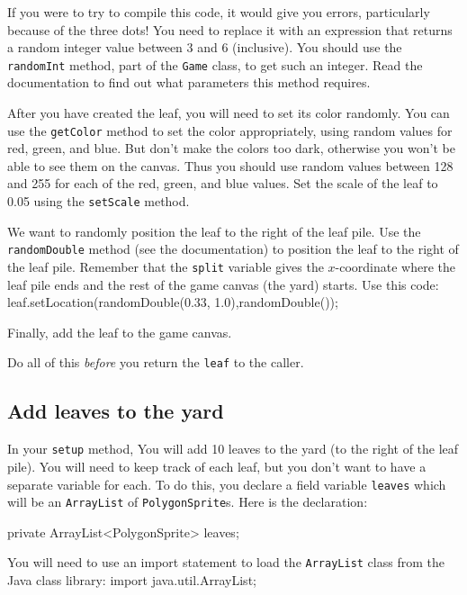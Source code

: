 \documentclass[12pt]{article}
\newenvironment{qv}%
  {\quote
   \verbatim}%
  {\endverbatim
   \endquote}
\newcommand{\code}{\texttt}
\begin{document}
If you were to try to compile this code, it would give you errors,
particularly because of the three dots! 
You need to replace it
with an expression that returns a random integer value between 3 and 6
(inclusive).
You should use the \code{randomInt} method, part of the \code{Game} class,
to get such an integer.  Read the documentation to find out
what parameters this method requires.

After you have created the leaf,
you will need to set its color randomly.
You can use the \code{getColor} method
to set the color appropriately, using random values for red, green, and blue.
But don't make the colors too dark,
otherwise you won't be able to see them on the canvas.
Thus you should use random values between 128 and 255
for each of the red, green, and blue values.
Set the scale of the leaf to 0.05
using the \code{setScale} method.

We want to randomly position the leaf to the right of the leaf pile.
Use the \code{randomDouble} method (see the documentation)
to position the leaf to the right of the leaf pile.
Remember that the \code{split} variable gives the $x$-coordinate
where the leaf pile ends and the rest of the game canvas (the yard) starts.
Use this code:
\begin{qv}
  leaf.setLocation(randomDouble(0.33, 1.0),randomDouble());
\end{qv}

Finally, add the leaf to the game canvas.

Do all of this {\em before} you return the \code{leaf} to the caller.

\subsection*{Add leaves to the yard}
In your \code{setup} method,
You will add 10 leaves to the yard (to the right of the leaf pile).
You will need to keep track of each leaf,
but you don't want to have a separate variable for each.
To do this, you declare a field variable \code{leaves}
which will be an \code{ArrayList} of \code{PolygonSprite}s.
Here is the declaration:

\begin{qv}
private ArrayList<PolygonSprite> leaves;
\end{qv}

You will need to use an import statement
to load the \code{ArrayList} class from the Java class library:
\begin{qv}
import java.util.ArrayList;
\end{qv}
\end{document}
